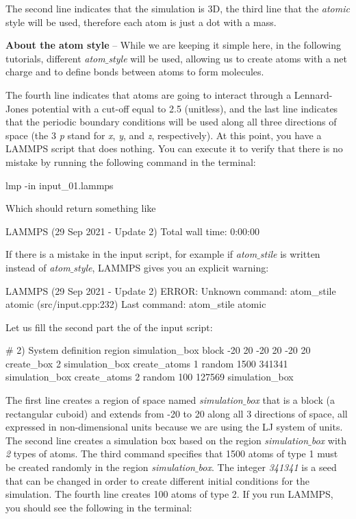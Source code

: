 The second line indicates that the simulation
is 3D, the third line that the \textit{atomic} style
will be used, therefore each atom is just a dot with a mass.

\noindent \textbf{About the atom style} -- While we are keeping it simple here,
in the following tutorials, different \textit{atom$\_$style} will be used,
allowing us to create atoms with a net charge and to define 
bonds between atoms to form molecules.

The fourth line indicates that atoms are going to interact
through a Lennard-Jones potential with a cut-off equal to
2.5 (unitless), and the last line indicates that the
periodic boundary conditions will be used along all three
directions of space (the 3 \textit{p} stand for \textit{x}, \textit{y}, and \textit{z},
respectively).
At this point, you have a LAMMPS script that does nothing.
You can execute it to verify that there is no mistake by
running the following command in the terminal:

\begin{lcverbatim}
lmp -in input_01.lammps
\end{lcverbatim}

\noindent Which should return something like

\begin{lcverbatim}
LAMMPS (29 Sep 2021 - Update 2)
Total wall time: 0:00:00
\end{lcverbatim}

\noindent If there is a mistake in the input script, for example if
\textit{atom$\_$stile} is written instead of \textit{atom$\_$style}, LAMMPS
gives you an explicit warning:

\begin{lcverbatim}
LAMMPS (29 Sep 2021 - Update 2)
ERROR: Unknown command: atom_stile  atomic (src/input.cpp:232)
Last command: atom_stile atomic
\end{lcverbatim}

\noindent Let us fill the second part the of the input script:

\begin{lcverbatim}
# 2) System definition
region simulation_box block -20 20 -20 20 -20 20
create_box 2 simulation_box
create_atoms 1 random 1500 341341 simulation_box
create_atoms 2 random 100 127569 simulation_box
\end{lcverbatim}

\noindent The first line creates a region of space
named \textit{simulation$\_$box} that is a block (a rectangular cuboid) and
extends from -20 to 20 along all 3 directions of space, all expressed in
non-dimensional units because we are using the LJ system
of units. The second line creates a simulation box based on
the region \textit{simulation$\_$box} with \textit{2} types of atoms. The third
command specifies that 1500 atoms of type 1 must be created
randomly in the region \textit{simulation$\_$box}. The integer \textit{341341} is a
seed that can be changed in order to create different
initial conditions for the simulation. The fourth line
creates 100 atoms of type 2.
If you run LAMMPS, you should see the following in the
terminal:


